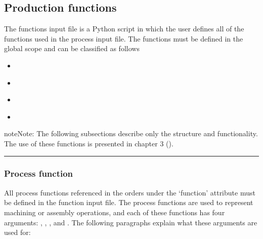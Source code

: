 \documentclass[letterpaper,10pt,english]{sphinxmanual}
\begin{document}
\subsection{Production functions}
\label{\detokenize{source/Interface_files/function_file:production-functions}}\label{\detokenize{source/Interface_files/function_file:function-file}}\label{\detokenize{source/Interface_files/function_file::doc}}
\sphinxAtStartPar
The functions input file is a Python script in which the user defines all of the functions used in the process input
file. The functions must be defined in the global scope and can be classified as follows
\begin{itemize}
\item {} 
\sphinxAtStartPar
{\hyperref[\detokenize{source/Interface_files/function_file:process-function}]{}}

\item {} 
\sphinxAtStartPar
{\hyperref[\detokenize{source/Interface_files/function_file:source-sink}]{}}

\item {} 
\sphinxAtStartPar
{\hyperref[\detokenize{source/Interface_files/function_file:global-function}]{}}

\item {} 
\sphinxAtStartPar
{\hyperref[\detokenize{source/Interface_files/function_file:distribution}]{}}

\end{itemize}

\begin{sphinxadmonition}{note}{Note:}
\sphinxAtStartPar
The following subsections describe only the structure and functionality. The use of these functions is presented in
chapter 3 ({\hyperref[\detokenize{source/Examples/examples:examples}]{}}).
\end{sphinxadmonition}


\bigskip\hrule\bigskip



\subsubsection{Process function}
\label{\detokenize{source/Interface_files/function_file:process-function}}\label{\detokenize{source/Interface_files/function_file:id1}}
\sphinxAtStartPar
All process functions referenced in the orders under the ‘function’ attribute must be defined in the function input
file. The process functions are used to represent machining or assembly operations, and each of these functions has four
arguments: , , , and . The following paragraphs explain what these arguments are used for:
\end{document}
